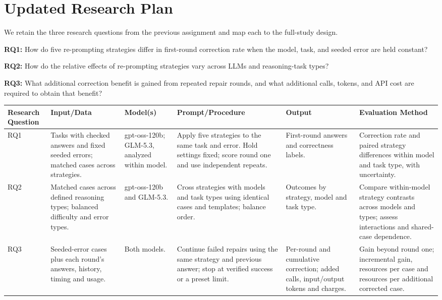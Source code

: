 \documentclass[11pt,letterpaper]{article}
\begin{document}
\clearpage
\section{Updated Research Plan}
We retain the three research questions from the previous assignment and map each to the full-study design.

\textbf{RQ1:} How do five re-prompting strategies differ in first-round correction rate when the model, task, and seeded error are held constant?

\textbf{RQ2:} How do the relative effects of re-prompting strategies vary across LLMs and reasoning-task types?

\textbf{RQ3:} What additional correction benefit is gained from repeated repair rounds, and what additional calls, tokens, and API cost are required to obtain that benefit?

{\footnotesize
\setlength{\tabcolsep}{4pt}
\renewcommand{\arraystretch}{1.20}
\begin{tabularx}{\linewidth}{Y{0.60}Y{1.22}Y{0.77}Y{1.38}Y{0.88}Y{1.15}}
\toprule
{}
\textbf{Research Question} & \textbf{Input/Data} & \textbf{Model(s)} & \textbf{Prompt/Procedure} & \textbf{Output} & \textbf{Evaluation Method} \\
\midrule
RQ1 & Tasks with checked answers and fixed seeded errors; matched cases across strategies. & gpt-oss-120b; GLM-5.3, analyzed within model. & Apply five strategies to the same task and error. Hold settings fixed; score round one and use independent repeats. & First-round answers and correctness labels. & Correction rate and paired strategy differences within model and task type, with uncertainty. \\
RQ2 & Matched cases across defined reasoning types; balanced difficulty and error types. & gpt-oss-120b and GLM-5.3. & Cross strategies with models and task types using identical cases and templates; balance order. & Outcomes by strategy, model and task type. & Compare within-model strategy contrasts across models and types; assess interactions and shared-case dependence. \\
RQ3 & Seeded-error cases plus each round's answers, history, timing and usage. & Both models. & Continue failed repairs using the same strategy and previous answer; stop at verified success or a preset limit. & Per-round and cumulative correction; added calls, input/output tokens and charges. & Gain beyond round one; incremental gain, resources per case and resources per additional corrected case. \\
\bottomrule
\end{tabularx}}
\end{document}
